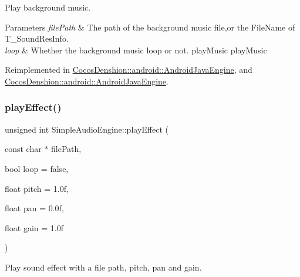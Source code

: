 Play background music.


\begin{DoxyParams}{Parameters}
{\em file\+Path} & The path of the background music file,or the File\+Name of T\+\_\+\+Sound\+Res\+Info. \\
\hline
{\em loop} & Whether the background music loop or not.  play\+Music  play\+Music \\
\hline
\end{DoxyParams}


Reimplemented in \hyperlink{classCocosDenshion_1_1android_1_1AndroidJavaEngine_aeb8086c0fa8689075d4e2d2bf05f9439}{Cocos\+Denshion\+::android\+::\+Android\+Java\+Engine}, and \hyperlink{classCocosDenshion_1_1android_1_1AndroidJavaEngine_a510170bb28df6e2035ad479831e6ef33}{Cocos\+Denshion\+::android\+::\+Android\+Java\+Engine}.

\mbox{\label{classCocosDenshion_1_1SimpleAudioEngine_afdd4400a377a350f728b69fae870db20}} 
\subsubsection{\texorpdfstring{play\+Effect()}{playEffect()}\hspace{0.1cm}{\footnotesize\ttfamily [1/2]}}
{\footnotesize\ttfamily unsigned int Simple\+Audio\+Engine\+::play\+Effect (\begin{DoxyParamCaption}\item[{const char $\ast$}]{file\+Path,  }\item[{bool}]{loop = {\ttfamily false},  }\item[{float}]{pitch = {\ttfamily 1.0f},  }\item[{float}]{pan = {\ttfamily 0.0f},  }\item[{float}]{gain = {\ttfamily 1.0f} }\end{DoxyParamCaption})\hspace{0.3cm}{\ttfamily [virtual]}}

Play sound effect with a file path, pitch, pan and gain.


